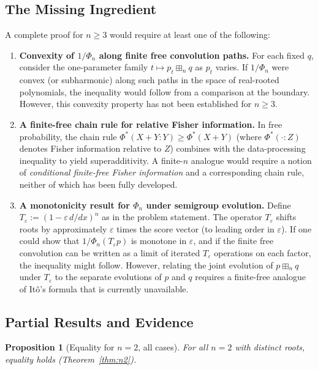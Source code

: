 \documentclass[12pt]{article}
\newtheorem{proposition}[theorem]{Proposition}
\theoremstyle{definition}
\begin{document}
\subsection*{The Missing Ingredient}

A complete proof for $n \ge 3$ would require at least one of the following:

\begin{enumerate}
  \item \textbf{Convexity of $1/\Phi_n$ along finite free convolution paths.}
  For each fixed $q$, consider the one-parameter family $t \mapsto p_t \boxplus_n q$ as $p_t$ varies. If $1/\Phi_n$ were convex (or subharmonic) along such paths in the space of real-rooted polynomials, the inequality would follow from a comparison at the boundary. However, this convexity property has not been established for $n \ge 3$.

  \item \textbf{A finite-free chain rule for relative Fisher information.}
  In free probability, the chain rule $\Phi^*(X+Y : Y) \ge \Phi^*(X+Y)$ (where $\Phi^*(\cdot : Z)$ denotes Fisher information relative to $Z$) combines with the data-processing inequality to yield superadditivity. A finite-$n$ analogue would require a notion of \emph{conditional finite-free Fisher information} and a corresponding chain rule, neither of which has been fully developed.

  \item \textbf{A monotonicity result for $\Phi_n$ under semigroup evolution.}
  Define $T_\varepsilon := (1 - \varepsilon\,d/dx)^n$ as in the problem statement. The operator $T_\varepsilon$ shifts roots by approximately $\varepsilon$ times the score vector (to leading order in $\varepsilon$). If one could show that $1/\Phi_n(T_\varepsilon p)$ is monotone in $\varepsilon$, and if the finite free convolution can be written as a limit of iterated $T_\varepsilon$ operations on each factor, the inequality might follow. However, relating the joint evolution of $p \boxplus_n q$ under $T_\varepsilon$ to the separate evolutions of $p$ and $q$ requires a finite-free analogue of Itô's formula that is currently unavailable.
\end{enumerate}

\subsection*{Partial Results and Evidence}

\begin{proposition}[Equality for $n=2$, all cases]\label{prop:equality_n2}
For all $n=2$ with distinct roots, equality holds (Theorem~\ref{thm:n2}).
\end{proposition}
\end{document}

